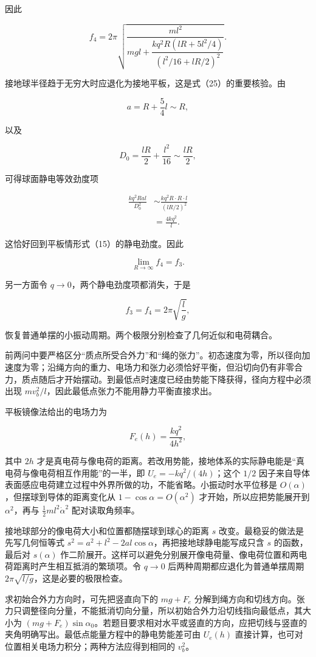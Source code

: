 \documentclass[12pt,a4paper,UTF8]{ctexart}
\begin{document}
因此

\[\boxed{
f_4=2\pi\sqrt{
\frac{ml^2}{
mgl+\dfrac{kq^2R\left(lR+5l^2/4\right)}
{\left(l^2/16+lR/2\right)^2}}
}
}. \tag{25}\]

接地球半径趋于无穷大时应退化为接地平板，这是式（25）的重要核验。由

\[a=R+\frac54l\sim R,\]

以及

\[D_0=\frac{lR}{2}+\frac{l^2}{16}\sim\frac{lR}{2},\]

可得球面静电等效劲度项

\[\begin{aligned}
\frac{kq^2Ral}{D_0^2}
&\sim\frac{kq^2R\cdot R\cdot l}{(lR/2)^2}\\
&=\frac{4kq^2}{l}.
\end{aligned}\]

这恰好回到平板情形式（15）的静电劲度。因此

\[\lim_{R\to\infty}f_4=f_3.\]

另一方面令 \(q\to0\)，两个静电劲度项都消失，于是

\[f_3=f_4=2\pi\sqrt{\frac{l}{g}},\]

恢复普通单摆的小振动周期。两个极限分别检查了几何近似和电荷耦合。

前两问中要严格区分``质点所受合外力''和``绳的张力''。初态速度为零，所以径向加速度为零；沿绳方向的重力、电场力和张力必须恰好平衡，但沿切向仍有非零合力，质点随后才开始摆动。到最低点时速度已经由势能下降获得，径向方程中必须出现
\(mv_b^2/l\)，因此最低点张力不能用静力平衡直接求出。

平板镜像法给出的电场力为

\[F_e(h)=\frac{kq^2}{4h^2},\]

其中 \(2h\)
才是真电荷与像电荷的距离。若改用势能，接地体系的实际静电能是``真电荷与像电荷相互作用能''的一半，即
\(U_e=-kq^2/(4h)\)；这个 \(1/2\)
因子来自导体表面感应电荷建立过程中外界所做的功，不能省略。小振动时水平位移是
\(O(\alpha)\)，但摆球到导体的距离变化从 \(1-\cos\alpha=O(\alpha^2)\)
才开始，所以应把势能展开到 \(\alpha^2\)，再与
\(\tfrac12ml^2\dot\alpha^2\) 配对读取角频率。

接地球部分的像电荷大小和位置都随摆球到球心的距离 \(s\)
改变。最稳妥的做法是先写几何恒等式
\(s^2=a^2+l^2-2al\cos\alpha\)，再把接地球静电能写成只含 \(s\)
的函数，最后对 \(s(\alpha)\)
作二阶展开。这样可以避免分别展开像电荷量、像电荷位置和两电荷距离时产生相互抵消的繁琐项。令
\(q\to0\) 后两种周期都应退化为普通单摆周期
\(2\pi\sqrt{l/g}\)，这是必要的极限检查。

求初始合外力方向时，可先把竖直向下的 \(mg+F_e\)
分解到绳方向和切线方向。张力只调整径向分量，不能抵消切向分量，所以初始合外力沿切线指向最低点，其大小为
\((mg+F_e)\sin\alpha_0\)。若题目要求相对水平或竖直的方向，应把切线与竖直的夹角明确写出。最低点能量方程中的静电势能差可由
\(U_e(h)\) 直接计算，也可对位置相关电场力积分；两种方法应得到相同的
\(v_b^2\)。
\end{document}
